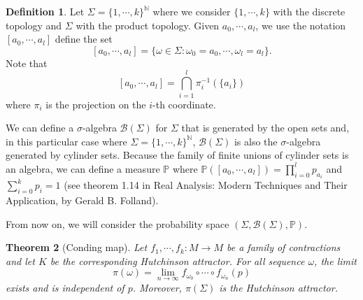 \documentclass[a4paper]{article}
\theoremstyle{plain}
\newtheorem{theorem}{Theorem}[section] %
\theoremstyle{definition}
\newtheorem{defn}[theorem]{Definition}%
\newcommand{\PP}{\mathbb{P}}
\newcommand{\Pil}{\mathcal{P}}
\begin{document}



\begin{defn}
   Let $\Sigma = \{1, \cdots, k\}^\mathbb{N}$ where we consider $\{1, \cdots, k\}$ with the discrete topology and $\Sigma$ with the product topology. Given $a_0, \cdots, a_l$, we use the notation $[a_0, \cdots, a_l]$ define the set $$[a_0, \cdots, a_l]=\{\omega\in\Sigma: \omega_0=a_0, \cdots, \omega_l=a_l\}.$$
   Note that $$[a_0, \cdots, a_l] = \bigcap_{i=1}^l \pi^{-1}_i(\{a_i\})$$ where $\pi_i$ is the projection on the $i$-th coordinate.
\end{defn}

We can define a $\sigma$-algebra $\mathcal B(\Sigma)$ for $\Sigma$ that is generated by the open sets and, in this particular case where $\Sigma=\{1, \cdots, k\}^{\mathbb N}$, $\mathcal B(\Sigma)$ is also the $\sigma$-algebra generated by cylinder sets. Because the family of finite unions of cylinder sets is an algebra, we can define a measure $\PP$ where $\PP([a_0, \cdots, a_l])=\prod_{i=0}^l p_{a_i}$ and $\sum_{i=0}^k p_i=1$ (see theorem 1.14 in Real Analysis: Modern Techniques and Their Application, by Gerald B. Folland).

From now on, we will consider the probability space $(\Sigma, \mathcal B(\Sigma), \PP)$.

\begin{theorem}[Conding map]\label{conding}
Let $f_1, \cdots, f_k: M\rightarrow M$ be a family of contractions and let $K$ be the corresponding Hutchinson attractor. For all sequence $\omega$, the limit
$$\pi(\omega)=\lim_{n\to\infty} f_{\omega_0}\circ\cdots\circ f_{\omega_n}(p)$$
exists and is independent of $p$. Moreover, $\pi(\Sigma)$ is the Hutchinson attractor.
\end{theorem}
\end{document}

